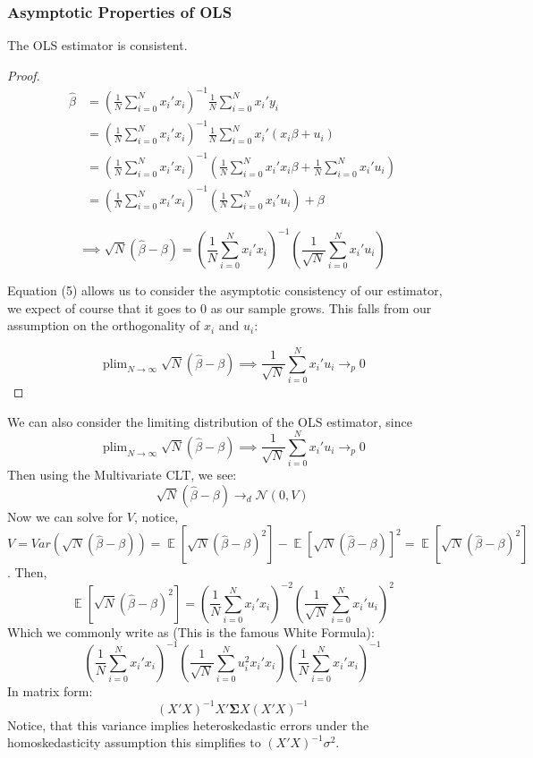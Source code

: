 \documentclass[dvips,11pt]{article}
\DeclareMathOperator{\?}{\,?\,}
\DeclareMathOperator{\E}{\mathbb{E}}
\DeclareMathOperator*{\plim}{plim}
\newenvironment{claim}[1]{\par\noindent{\bfseries Claim.}\space#1}{}
\begin{document}
\subsubsection{Asymptotic Properties of OLS}
\begin{claim} The OLS estimator is consistent.
\end{claim}
\begin{proof}
$$
\begin{aligned}
\hat\beta &= (\frac{1}{N}\sum^N_{i=0}x_i'x_i)^{-1}\frac{1}{N}\sum^N_{i=0}x_i'y_i \\
&= (\frac{1}{N}\sum^N_{i=0}x_i'x_i)^{-1}\frac{1}{N}\sum^N_{i=0}x_i'(x_i\beta+u_i) \\
&= (\frac{1}{N}\sum^N_{i=0}x_i'x_i)^{-1}(\frac{1}{N}\sum^N_{i=0}x_i'x_i\beta+\frac{1}{N}\sum^N_{i=0}x_i'u_i)\\
&= (\frac{1}{N}\sum^N_{i=0}x_i'x_i)^{-1}(\frac{1}{N}\sum^N_{i=0}x_i'u_i) + \beta
\end{aligned}
$$


\begin{equation}\implies \sqrt{N}(\hat\beta - \beta) = (\frac{1}{N}\sum^N_{i=0}x_i'x_i)^{-1}(\frac{1}{\sqrt{N}}\sum^N_{i=0}x_i'u_i)\end{equation}


Equation (5) allows us to consider the asymptotic consistency of our estimator, we expect of course that it goes to 0 as our sample grows. This falls from our assumption on the orthogonality of $x_i$ and $u_i$:

$$
\plim_{N\rightarrow\infty}\sqrt{N}(\hat\beta - \beta) \implies \frac{1}{\sqrt{N}}\sum^N_{i=0}x_i'u_i \rightarrow_p 0
$$
\end{proof}
We can also consider the limiting distribution of the OLS estimator, since
$$
\plim_{N\rightarrow\infty}\sqrt{N}(\hat\beta - \beta) \implies \frac{1}{\sqrt{N}}\sum^N_{i=0}x_i'u_i \rightarrow_p 0
$$
Then using the Multivariate CLT, we see:
$$
\sqrt{N}(\hat\beta - \beta) \rightarrow_d \mathcal{N}(0, V)
$$
Now we can solve for $V$, notice, $V = Var(\sqrt{N}(\hat\beta - \beta)) = \E[\sqrt{N}(\hat\beta - \beta)^2] - \E[\sqrt{N}(\hat\beta - \beta)]^2 = \E[\sqrt{N}(\hat\beta - \beta)^2]$. Then,
$$\E[\sqrt{N}(\hat\beta - \beta)^2] = (\frac{1}{N}\sum^N_{i=0}x_i'x_i)^{-2}(\frac{1}{\sqrt{N}}\sum^N_{i=0}x_i'u_i)^2$$
Which we commonly write as (This is the famous White Formula):
$$(\frac{1}{N}\sum^N_{i=0}x_i'x_i)^{-1}(\frac{1}{\sqrt{N}}\sum^N_{i=0}u_i^2x_i'x_i)(\frac{1}{N}\sum^N_{i=0}x_i'x_i)^{-1}$$
In matrix form: $$(X'X)^{-1}X'\boldsymbol{\Sigma} X(X'X)^{-1}$$
Notice, that this variance implies heteroskedastic errors under the homoskedasticity assumption this simplifies to $(X'X)^{-1}\sigma^2$.
\end{document}
